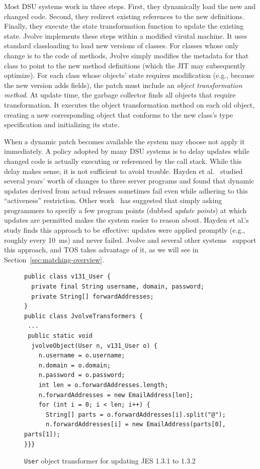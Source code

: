 \documentclass[natbib]{sigplanconf}
\newcommand{\code}[1]{\lstinline|#1|\xspace}
\newcommand{\TOS}{TOS\xspace}
\begin{document}
Most DSU systems work in three steps.  First, they dynamically load
the new and changed code.  Second, they redirect existing references
to the new definitions.  Finally, they execute the state
transformation function to update the existing state.  Jvolve
implements these steps within a modified virutal machine. It uses
standard classloading to load new versions of classes.  For classes
whose only change is to the code of methods, Jvolve simply modifies
the metadata for that class to point to the new method definitions
(which the JIT may subsequently optimize).  For each class whose
objects' state requires modification (e.g., because the new version
adds fields), the patch must include an \emph{object transformation
  method}.  At update time, the garbage collector finds all objects
that require transformation. It executes the object transformation
method on each old object, creating a new corresponding object that
conforms to the new class's type specification and initializing its
state.

When a dynamic patch becomes available the system may choose not apply
it immediately.  A policy adopted by many DSU systems is to delay
updates while changed code is actually executing or referenced by the
call stack.  While this delay makes sense, it is not sufficient to
avoid trouble.  Hayden et al.~\cite{hayden11testing-journal} studied
several years' worth of changes to three server programs and found
that dynamic updates derived from actual releases sometimes fail even
while adhering to this ``activeness'' restriction.  Other
work~\cite{HicksNettles03} has suggested that simply asking
programmers to specify a few program points (dubbed \emph{update
  points}) at which updates are permitted makes the system easier to
reason about.  Hayden et al.'s study finds this approach to be
effective: updates were applied promptly (e.g., roughly every 10~ms)
and never failed.  Jvolve and several other
systems~\cite{neamtiu06dsu,HicksNettles03,upstare} support this
approach, and \TOS takes advantage of it, as we will see in
Section~\ref{sec:matching-overview}.

\begin{figure}
\begin{lstlisting}
public class v131_User {
  private final String username, domain, password;
  private String[] forwardAddresses;
}
public class JvolveTransformers {
 ...
 public static void
  jvolveObject(User n, v131_User o) {
    n.username = o.username;
    n.domain = o.domain;
    n.password = o.password;
    int len = o.forwardAddresses.length;
    n.forwardAddresses = new EmailAddress[len];
    for (int i = 0; i < len; i++) {
      String[] parts = o.forwardAddresses[i].split("@");
      n.forwardAddresses[i] = new EmailAddress(parts[0], parts[1]);
}}}
\end{lstlisting}
\caption{\code{User} object transformer for updating JES 1.3.1 to 1.3.2}
\label{fig:example-xform}
\end{figure}
\end{document}
